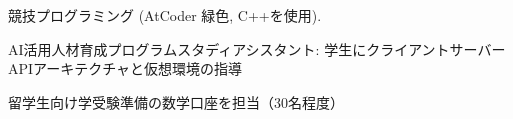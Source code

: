 

\begin{cvparagraph}

\begin{cvbullets}
    \item 競技プログラミング (AtCoder 緑色, C++を使用).
    \item AI活用人材育成プログラムスタディアシスタント: 学生にクライアントサーバーAPIアーキテクチャと仮想環境の指導
    \item 留学生向け学受験準備の数学口座を担当（30名程度）
\end{cvbullets}
\end{cvparagraph}
